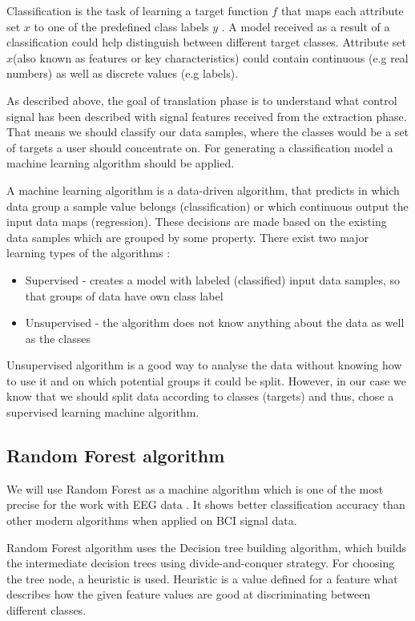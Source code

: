 \documentclass[12pt]{article}
\theoremstyle{definition}
\begin{document}
Classification is the task of learning a target function $f$ that maps each attribute set $x$ to one of the predefined class labels $y$ \cite{classification_basics}. A model received as a result of a classification could help distinguish between different target classes. Attribute set $x$(also known as features or key characteristics) could contain continuous (e.g real numbers) as well as discrete values (e.g labels).

As described above, the goal of translation phase is to understand what control signal has been described with signal features received from the extraction phase. That means we should classify our data samples, where the classes would be a set of targets a user should concentrate on. For generating a classification model a machine learning algorithm should be applied. 

A machine learning algorithm is a data-driven algorithm, that predicts in which data group a sample value belongs (classification) or which continuous output the input data maps (regression). These decisions are made based on the existing data samples which are grouped by some property. There exist two major learning types of the algorithms \cite{ml_types}:
\begin{itemize}
\item Supervised - creates a model with labeled (classified) input data samples, so that groups of data have own class label
\item Unsupervised - the algorithm does not know anything about the data as well as the classes
\end{itemize}
Unsupervised algorithm is a good way to analyse the data without knowing how to use it and on which potential groups it could be split. However, in our case we know that we should split data according to classes (targets) and thus, chose a supervised learning machine algorithm.

\subsection{Random Forest algorithm}

We will use Random Forest as a machine algorithm which is one of the most precise for the work with EEG data \cite{masso}. It shows better classification accuracy than other modern algorithms when applied on BCI signal data. 

Random Forest algorithm uses the Decision tree building algorithm, which builds the intermediate decision trees using divide-and-conquer strategy. For choosing the tree node, a heuristic is used. Heuristic is a value defined for a feature what describes how the given feature values are good at discriminating between different classes. \cite{hyper-heur}
\end{document}
